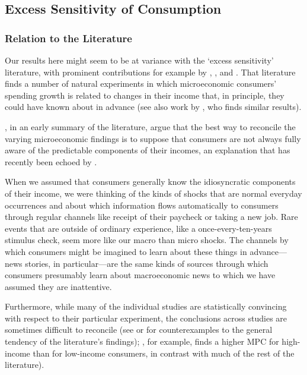 \documentclass[titlepage]{./econtex}
\begin{document}

\subsection{Excess Sensitivity of Consumption} \label{sec:ExcessSens}

\subsubsection{Relation to the Literature}

Our results here might seem to be at variance with the `excess sensitivity' literature, with prominent contributions for example by \cite{soulelesTaxRefunds}, \cite{jpsTax}, and \cite{psjmMPC2008}.  That literature finds a number of natural experiments in which microeconomic consumers' spending growth is related to changes in their income that, in principle, they could have known about in advance (see also work by \cite{kuengTaxnews}, who finds similar results).

\cite{BrowningColladoAER}, in an early summary of the literature, argue that the best way to reconcile the varying microeconomic findings is to suppose that consumers are not always fully aware of the predictable components of their incomes, an explanation that has recently been echoed by \cite{parker25million}.

When we assumed that consumers generally know the idiosyncratic components of their income, we were thinking of the kinds of shocks that are normal everyday occurrences and about which information flows automatically to consumers through regular channels like receipt of their paycheck or taking a new job.  Rare events that are outside of ordinary experience, like a once-every-ten-years stimulus check, seem more like our macro than micro shocks.  The channels by which consumers might be imagined to learn about these things in advance---news stories, in particular---are the same kinds of sources through which consumers presumably learn about macroeconomic news to which we have assumed they are inattentive. 

Furthermore, while many of the individual studies are statistically convincing with respect to their particular experiment, the conclusions across studies are sometimes difficult to reconcile (see \cite{hsiehAlaska} or \cite{CoulibalyLiMortgage} for counterexamples to the general tendency of the literature's findings); \cite{kuengAlaska}, for example, finds a higher MPC for high-income than for low-income consumers, in contrast with much of the rest of the literature).
\end{document}
